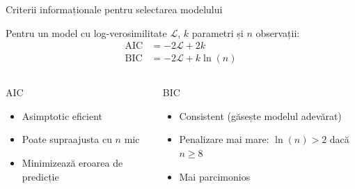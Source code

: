 \documentclass[9pt, aspectratio=169, t]{beamer}
\begin{document}
\begin{frame}{Criterii informaționale pentru selectarea modelului}
    \begin{defn}
        Pentru un model cu log-verosimilitate $\mathcal{L}$, $k$ parametri și $n$ observații:
        \begin{align*}
            \text{AIC} &= -2\mathcal{L} + 2k \\
            \text{BIC} &= -2\mathcal{L} + k \ln(n)
        \end{align*}
    \end{defn}

    \vspace{0.2cm}

    \begin{columns}[T]
        \begin{exampleblock}{AIC}
            \begin{itemize}\setlength{\itemsep}{0pt}
                \item Asimptotic eficient
                \item Poate supraajusta cu $n$ mic
                \item Minimizează eroarea de predicție
            \end{itemize}
        \end{exampleblock}

        \begin{block}{BIC}
            \begin{itemize}\setlength{\itemsep}{0pt}
                \item Consistent (găsește modelul adevărat)
                \item Penalizare mai mare: $\ln(n) > 2$ dacă $n \geq 8$
                \item Mai parcimonios
            \end{itemize}
        \end{block}
    \end{columns}
\end{frame}
\end{document}
